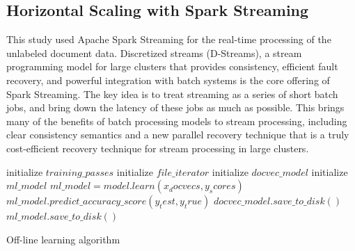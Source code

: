 \documentclass[conference]{IEEEtran}
\begin{document}
    \subsection{Horizontal Scaling with Spark Streaming}
        This study used Apache Spark Streaming for the real-time processing of the unlabeled document data. 
        Discretized streams (D-Streams), a stream programming model for large clusters that provides consistency, efficient fault recovery, and powerful integration with batch systems is the core offering of Spark Streaming. 
        The key idea is to treat streaming as a series of short batch jobs, and bring down the latency of these jobs as much as possible. 
        This brings many of the benefits of batch processing models to stream processing, including clear consistency semantics and a new parallel recovery technique that is a truly cost-efficient recovery technique for stream processing in large clusters\cite{zaharia2012discretized}.

    \begin{algorithm}[ht]
        \DontPrintSemicolon 
        \;
        initialize $training\_passes$\;
        initialize $file\_iterator$\;
        initialize $docvec\_model$\;
        initialize $ml\_model$\;
        \;
        \;
        \;
        \;
        $ml\_model = model.learn(x_docvecs, y_scores)$\;
        $ml\_model.predict\_accuracy\_score(y_test, y_true)$\;
        \;
        $docvec\_model.save\_to\_disk()$\;
        $ml\_model.save\_to\_disk()$\;
        \;
        \caption{Off-line learning algorithm}
         \label{offline_module_algo}
    \end{algorithm}
\end{document}
